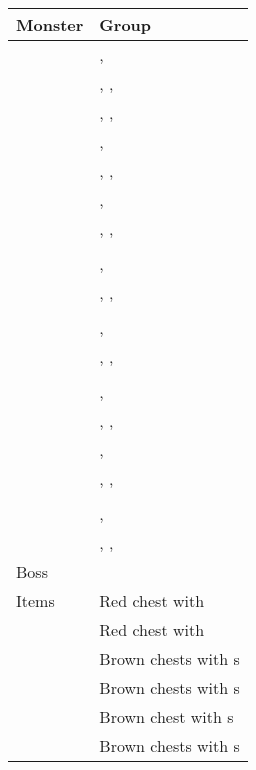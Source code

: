 \noindent\begin{tabularx}{\textwidth}[l]{lX}
	Monster & Group
\\ \hline
	\nameref{monster:garuda}
	& \nameref{monster:garuda}, \nameref{monster:garuda} \\
	& \nameref{monster:garuda}, \nameref{monster:garuda}, \nameref{monster:gargoyle} \\
	& \nameref{monster:garuda}, \nameref{monster:garuda}, \nameref{monster:garuda}
\\ \hline
	\nameref{monster:beholder}
	& \nameref{monster:beholder}, \nameref{monster:beholder} \\
	& \nameref{monster:beholder}, \nameref{monster:beholder}, \nameref{monster:beholder}
\\ \hline
	\nameref{monster:manticor}
	& \nameref{monster:manticor}, \nameref{monster:manticor} \\
	& \nameref{monster:manticor}, \nameref{monster:manticor}, \nameref{monster:manticor}
\\ \hline
	\nameref{monster:chimera}
	& \nameref{monster:chimera} \\
	& \nameref{monster:chimera}, \nameref{monster:sorcerer} \\
	& \nameref{monster:chimera}, \nameref{monster:sorcerer}, \nameref{monster:sorcerer}
\\ \hline
	\nameref{monster:thanatos}
	& \nameref{monster:thanatos} \\
	& \nameref{monster:thanatos}, \nameref{monster:manticor} \\
	& \nameref{monster:thanatos}, \nameref{monster:manticor}, \nameref{monster:beholder}
\\ \hline
	\nameref{monster:sorcerer}
	& \nameref{monster:sorcerer} \\
	& \nameref{monster:sorcerer}, \nameref{monster:sorcerer} \\
	& \nameref{monster:sorcerer}, \nameref{monster:sorcerer}, \nameref{monster:beholder}
\\ \hline
	\nameref{monster:naga}
	& \nameref{monster:naga}, \nameref{monster:naga} \\
	& \nameref{monster:naga}, \nameref{monster:naga}, \nameref{monster:naga}
\\ \hline
	\nameref{monster:gargoyle}
	& \nameref{monster:gargoyle} \\
	& \nameref{monster:gargoyle}, \nameref{monster:gargoyle} \\
	& \nameref{monster:gargoyle}, \nameref{monster:gargoyle}, \nameref{monster:gargoyle}
\\ \hline
	Boss & \nameref{monster:pazuzu}
\\ \hline
	Items
	& Red chest with \nameref{weapon:excalibur} \\
	& Red chest with \nameref{spell:flare} \\
	& Brown chests with \nameref{item:cure_potion}s \\
	& Brown chests with \nameref{item:heal_potion}s \\
	& Brown chest with \nameref{item:refresher}s \\
	& Brown chests with \nameref{weapon:bomb}s
\end{tabularx}
